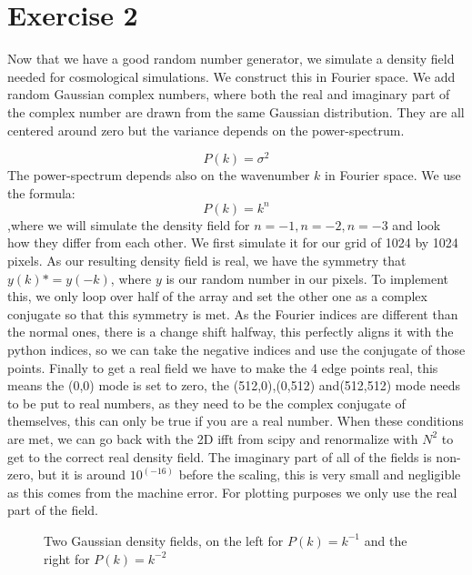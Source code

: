 \section{Exercise 2}
Now that we have a good random number generator, we simulate a density field needed for cosmological simulations. We construct this in Fourier space. We add random Gaussian complex numbers, where both the real and imaginary part of the complex number are drawn from the same Gaussian distribution. They are all centered around zero but the variance depends on the power-spectrum.

\begin{equation}
P(k)=\sigma^2
\end{equation}
The power-spectrum depends also on the wavenumber $k$ in Fourier space. We use the formula:
\begin{equation}
P(k)=k^n
\end{equation}
,where we will simulate the density field for $n=-1,n=-2,n=-3$ and look how they differ from each other. We first simulate it for our grid of 1024 by 1024 pixels. As our resulting density field is real, we have the symmetry that $y(k)*=y(-k)$, where $y$ is our random number in our pixels. To implement this, we only loop over half of the array and set the other one as a complex conjugate so that this symmetry is met. As the Fourier indices are different than the normal ones, there is a change shift halfway, this perfectly aligns it with the python indices, so we can take the negative indices and use the conjugate of those points.
Finally to get a real field we have to make the 4 edge points real, this means the (0,0) mode is set to zero, the (512,0),(0,512) and(512,512) mode needs to be put to real numbers, as they need to be the complex conjugate of themselves, this can only be true if you are a real number. When these conditions are met, we can go back with the 2D ifft from scipy and renormalize with $N^2$ to get to the correct real density field. The imaginary part of all of the fields is non-zero, but it is around $10^(-16)$ before the scaling, this is very small and negligible as this comes from the machine error. For plotting purposes we only use the real part of the field.


\begin{figure}
    \centering
    \qquad
    \caption{Two Gaussian density fields, on the left for $P(k)=k^{-1}$ and the right for $P(k)=k^{-2}$}
    \label{fig:fourier}
\end{figure}

